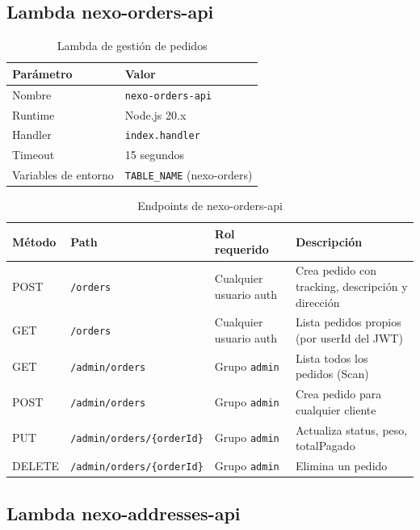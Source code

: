 \documentclass[12pt,a4paper]{article}
\begin{document}
\subsection{Lambda nexo-orders-api}

\begin{table}[H]
\centering
\begin{tabular}{@{}ll@{}}
\toprule
\textbf{Parámetro} & \textbf{Valor} \\
\midrule
Nombre & \texttt{nexo-orders-api} \\
Runtime & Node.js 20.x \\
Handler & \texttt{index.handler} \\
Timeout & 15 segundos \\
Variables de entorno & \texttt{TABLE\_NAME} (nexo-orders) \\
\bottomrule
\end{tabular}
\caption{Lambda de gestión de pedidos}
\end{table}

\begin{table}[H]
\centering
\begin{tabular}{@{}llll@{}}
\toprule
\textbf{Método} & \textbf{Path} & \textbf{Rol requerido} & \textbf{Descripción} \\
\midrule
POST   & \texttt{/orders} & Cualquier usuario auth & Crea pedido con tracking, descripción y dirección \\
GET    & \texttt{/orders} & Cualquier usuario auth & Lista pedidos propios (por userId del JWT) \\
GET    & \texttt{/admin/orders} & Grupo \texttt{admin} & Lista todos los pedidos (Scan) \\
POST   & \texttt{/admin/orders} & Grupo \texttt{admin} & Crea pedido para cualquier cliente \\
PUT    & \texttt{/admin/orders/\{orderId\}} & Grupo \texttt{admin} & Actualiza status, peso, totalPagado \\
DELETE & \texttt{/admin/orders/\{orderId\}} & Grupo \texttt{admin} & Elimina un pedido \\
\bottomrule
\end{tabular}
\caption{Endpoints de nexo-orders-api}
\end{table}

\subsection{Lambda nexo-addresses-api}
\end{document}
